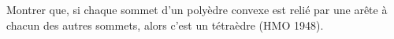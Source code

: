 Montrer que, si chaque sommet d'un polyèdre convexe est relié par une arête à chacun des autres sommets, alors c'est un tétraèdre (HMO 1948).
